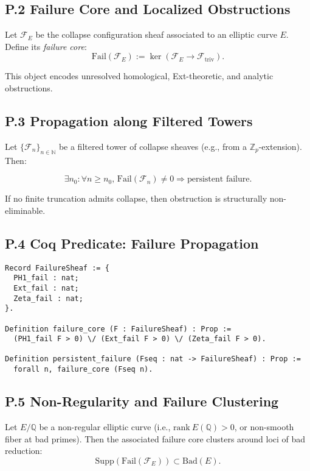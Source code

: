\documentclass[11pt]{article}
\begin{document}
\subsection*{P.2 Failure Core and Localized Obstructions}

Let \( \mathcal{F}_E \) be the collapse configuration sheaf associated to an elliptic curve \( E \). Define its \emph{failure core}:
\[
\mathrm{Fail}(\mathcal{F}_E) := \ker\left( \mathcal{F}_E \longrightarrow \mathcal{F}_{\mathrm{triv}} \right).
\]

This object encodes unresolved homological, Ext-theoretic, and analytic obstructions.

\subsection*{P.3 Propagation along Filtered Towers}

Let \( \{ \mathcal{F}_n \}_{n \in \mathbb{N}} \) be a filtered tower of collapse sheaves (e.g., from a \( \mathbb{Z}_p \)-extension). Then:

\[
\exists n_0: \forall n \geq n_0, \, \mathrm{Fail}(\mathcal{F}_n) \neq 0 \Rightarrow \text{persistent failure}.
\]

If no finite truncation admits collapse, then obstruction is structurally non-eliminable.

\subsection*{P.4 Coq Predicate: Failure Propagation}
\begin{lstlisting}[language=Coq]
Record FailureSheaf := {
  PH1_fail : nat;
  Ext_fail : nat;
  Zeta_fail : nat;
}.

Definition failure_core (F : FailureSheaf) : Prop :=
  (PH1_fail F > 0) \/ (Ext_fail F > 0) \/ (Zeta_fail F > 0).

Definition persistent_failure (Fseq : nat -> FailureSheaf) : Prop :=
  forall n, failure_core (Fseq n).
\end{lstlisting}

\subsection*{P.5 Non-Regularity and Failure Clustering}

Let \( E/\mathbb{Q} \) be a non-regular elliptic curve (i.e., \( \mathrm{rank}~E(\mathbb{Q}) > 0 \), or non-smooth fiber at bad primes). Then the associated failure core clusters around loci of bad reduction:
\[
\mathrm{Supp}(\mathrm{Fail}(\mathcal{F}_E)) \subset \mathrm{Bad}(E).
\]
\end{document}
